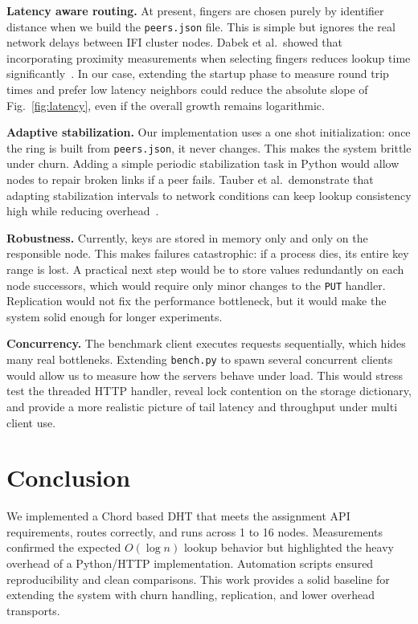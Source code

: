 \documentclass[conference]{IEEEtran}
\begin{document}
\textbf{Latency aware routing.}  
At present, fingers are chosen purely by identifier distance when we build the \texttt{peers.json} file. This is simple but ignores the real network delays between IFI cluster nodes. Dabek et al.\ showed that incorporating proximity measurements when selecting fingers reduces lookup time significantly~\cite{dabek2004dht}. In our case, extending the startup phase to measure round trip times and prefer low latency neighbors could reduce the absolute slope of Fig.~\ref{fig:latency}, even if the overall growth remains logarithmic.  

\textbf{Adaptive stabilization.}  
Our implementation uses a one shot initialization: once the ring is built from \texttt{peers.json}, it never changes. This makes the system brittle under churn. Adding a simple periodic stabilization task in Python would allow nodes to repair broken links if a peer fails. Tauber et al.\ demonstrate that adapting stabilization intervals to network conditions can keep lookup consistency high while reducing overhead~\cite{tauber2010autonomic}.  

\textbf{Robustness.}  
Currently, keys are stored in memory only and only on the responsible node. This makes failures catastrophic: if a process dies, its entire key range is lost. A practical next step would be to store values redundantly on each node successors, which would require only minor changes to the \texttt{PUT} handler. Replication would not fix the performance bottleneck, but it would make the system solid enough for longer experiments.  

\textbf{Concurrency.}  
The benchmark client executes requests sequentially, which hides many real bottleneks. Extending \texttt{bench.py} to spawn several concurrent clients would allow us to measure how the servers behave under load. This would stress test the threaded HTTP handler, reveal lock contention on the storage dictionary, and provide a more realistic picture of tail latency and throughput under multi client use.  


\section{Conclusion}
We implemented a Chord based DHT that meets the assignment API requirements, routes correctly, and runs across 1 to 16 nodes. Measurements confirmed the expected $O(\log n)$ lookup behavior but highlighted the heavy overhead of a Python/HTTP implementation. Automation scripts ensured reproducibility and clean comparisons. This work provides a solid baseline for extending the system with churn handling, replication, and lower overhead transports.



\end{document}
